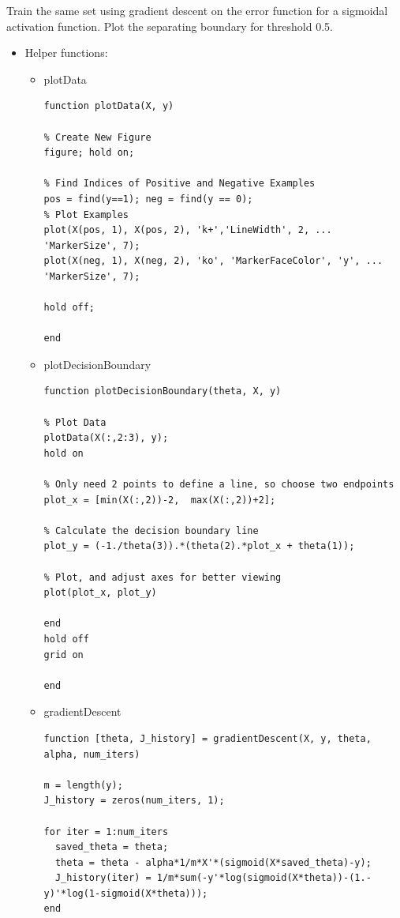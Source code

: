 \documentclass[12pt]{article}
\begin{document}
Train the same set using gradient descent on the error function for a sigmoidal activation function. Plot the separating boundary for threshold 0.5.
\begin{itemize}
    \item Helper functions:
    
    \begin{itemize}
        \item plotData

    
    \begin{lstlisting}
function plotData(X, y)

% Create New Figure
figure; hold on;

% Find Indices of Positive and Negative Examples
pos = find(y==1); neg = find(y == 0);
% Plot Examples
plot(X(pos, 1), X(pos, 2), 'k+','LineWidth', 2, ...
'MarkerSize', 7);
plot(X(neg, 1), X(neg, 2), 'ko', 'MarkerFaceColor', 'y', ...
'MarkerSize', 7);

hold off;

end
    \end{lstlisting}
    
    \item plotDecisionBoundary
\begin{lstlisting}
function plotDecisionBoundary(theta, X, y)

% Plot Data
plotData(X(:,2:3), y);
hold on

% Only need 2 points to define a line, so choose two endpoints
plot_x = [min(X(:,2))-2,  max(X(:,2))+2];

% Calculate the decision boundary line
plot_y = (-1./theta(3)).*(theta(2).*plot_x + theta(1));

% Plot, and adjust axes for better viewing
plot(plot_x, plot_y)

end
hold off
grid on

end
\end{lstlisting}    

\item gradientDescent

\begin{lstlisting}
function [theta, J_history] = gradientDescent(X, y, theta, alpha, num_iters)

m = length(y); 
J_history = zeros(num_iters, 1);

for iter = 1:num_iters
  saved_theta = theta;  
  theta = theta - alpha*1/m*X'*(sigmoid(X*saved_theta)-y);  
  J_history(iter) = 1/m*sum(-y'*log(sigmoid(X*theta))-(1.-y)'*log(1-sigmoid(X*theta)));
end


\end{lstlisting}
\end{itemize}
\end{itemize}
\end{document}
